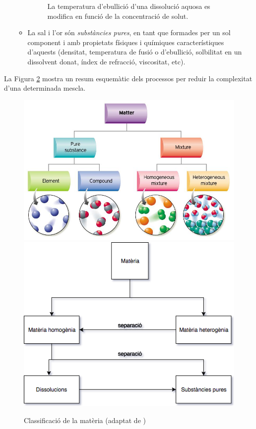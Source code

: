 \begin{itemize}
\begin{itemize}
\begin{figure}[h]
\caption{La temperatura d'ebullició d'una dissolució aquosa es modifica en funció de la concentració de solut.}
\label{fig:watsuc2}
\end{figure}
\item La sal i l'or són \emph{substàncies pures}, en tant que formades per un sol component i amb propietats físiques i químiques característiques d'aquests (densitat, temperatura de fusió o d'ebullició, solbilitat en un dissolvent donat, índex de refracció, viscositat, etc).
\end{itemize}
\end{itemize}


La Figura \ref{fig:SeparacioMescles} mostra un resum esquemàtic dels processos per reduir la complexitat d'una determinada mescla.

\begin{figure}[h]
\centering
\includegraphics[scale=0.35]{figures/Mixtures.png}
\includegraphics[scale=0.50]{figures/SeparacioMescles.png}
\caption{Classificació de la matèria (adaptat de \cite{caamano_ros_quimica_1991})}
\label{fig:SeparacioMescles}
\end{figure}

